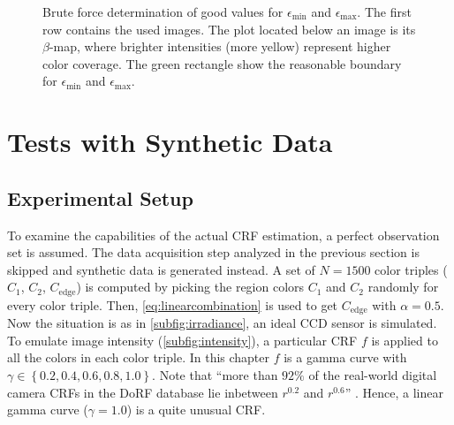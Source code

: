 \begin{figure}[bt]
{  }
  \caption[Brute force determination of good values for $\epsilon_\text{min}$ and $\epsilon_\text{max}$]{Brute force determination of good values for $\epsilon_\text{min}$ and $\epsilon_\text{max}$. The first row contains the used images. The plot located below an image is its $\beta$-map, where brighter intensities (more yellow) represent higher color coverage. The green rectangle show the reasonable boundary for $\epsilon_\text{min}$ and $\epsilon_\text{max}$.}
  \label{fig:distanceparameterplots}
\end{figure}






\clearpage

\section{Tests with Synthetic Data}
\label{sec:syntheticdata}

\subsection{Experimental Setup}
\label{subsec:syntheticDataExperimentalSetting}

To examine the capabilities of the actual CRF estimation, a perfect observation set is assumed. The data acquisition step analyzed in the previous section is skipped and synthetic data is generated instead. A set of $N = 1500$ color triples ($C_1$, $C_2$, $C_{\text{edge}}$) is computed by picking the region colors $C_1$ and $C_2$ randomly for every color triple. Then, \autoref{eq:linearcombination} is used to get $C_{\text{edge}}$ with $\alpha = 0.5$. Now the situation is as in \autoref{subfig:irradiance}, an ideal CCD sensor is simulated. To emulate image intensity (\autoref{subfig:intensity}), a particular CRF $f$ is applied to all the colors in each color triple. In this chapter $f$ is a gamma curve with $\gamma \in \left\{0.2, 0.4, 0.6, 0.8, 1.0\right\}$. Note that ``more than $92 \%$ of the real-world digital camera CRFs in the DoRF database lie inbetween $r^{0.2}$ and $r^{0.6}$'' \cite{ng_cvpr07}. Hence, a linear gamma curve ($\gamma = 1.0$) is a quite unusual CRF.



